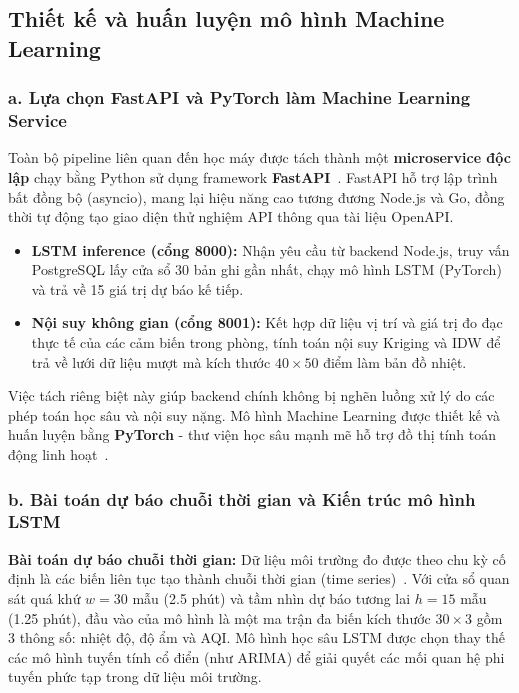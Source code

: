 \subsection{Thiết kế và huấn luyện mô hình Machine Learning}
\label{subsec:design:ml}

\subsubsection*{a. Lựa chọn FastAPI và PyTorch làm Machine Learning Service}

Toàn bộ pipeline liên quan đến học máy được tách thành một \textbf{microservice độc lập} chạy bằng Python sử dụng framework \textbf{FastAPI}~\cite{fastapi}. FastAPI hỗ trợ lập trình bất đồng bộ (asyncio), mang lại hiệu năng cao tương đương Node.js và Go, đồng thời tự động tạo giao diện thử nghiệm API thông qua tài liệu OpenAPI.
\begin{itemize}[leftmargin=2cm]
  \item \textbf{LSTM inference (cổng 8000):} Nhận yêu cầu từ backend Node.js, truy vấn PostgreSQL lấy cửa sổ 30 bản ghi gần nhất, chạy mô hình LSTM (PyTorch) và trả về 15 giá trị dự báo kế tiếp.
  \item \textbf{Nội suy không gian (cổng 8001):} Kết hợp dữ liệu vị trí và giá trị đo đạc thực tế của các cảm biến trong phòng, tính toán nội suy Kriging và IDW để trả về lưới dữ liệu mượt mà kích thước $40 \times 50$ điểm làm bản đồ nhiệt.
\end{itemize}

Việc tách riêng biệt này giúp backend chính không bị nghẽn luồng xử lý do các phép toán học sâu và nội suy nặng. Mô hình Machine Learning được thiết kế và huấn luyện bằng \textbf{PyTorch} - thư viện học sâu mạnh mẽ hỗ trợ đồ thị tính toán động linh hoạt~\cite{pytorch2019}.

\subsubsection*{b. Bài toán dự báo chuỗi thời gian và Kiến trúc mô hình LSTM}

\textbf{Bài toán dự báo chuỗi thời gian:} Dữ liệu môi trường đo được theo chu kỳ cố định là các biến liên tục tạo thành chuỗi thời gian (time series)~\cite{box2015time}. Với cửa sổ quan sát quá khứ $w = 30$ mẫu (2.5 phút) và tầm nhìn dự báo tương lai $h = 15$ mẫu (1.25 phút), đầu vào của mô hình là một ma trận đa biến kích thước $30 \times 3$ gồm 3 thông số: nhiệt độ, độ ẩm và AQI. Mô hình học sâu LSTM được chọn thay thế các mô hình tuyến tính cổ điển (như ARIMA) để giải quyết các mối quan hệ phi tuyến phức tạp trong dữ liệu môi trường.


